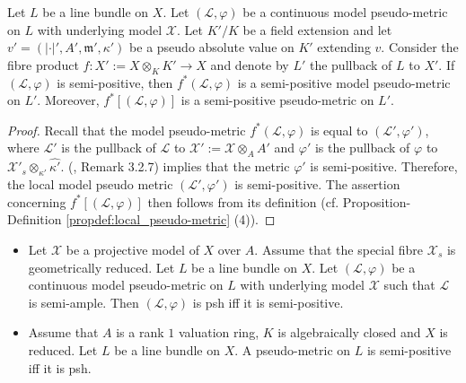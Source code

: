 \documentclass [11pt,reqno]{amsart}
\newcommand{\1}{\mathmybb{1}}
\def\cL{{\mathcal{L}}}
\def\cX{{\mathcal{X}}}
\def\m{\mathfrak m}
\begin{document}
\begin{proposition}
\label{prop:semi-positive_scalar_extension}
Let $L$ be a line bundle on $X$. Let $(\cL,\varphi)$ be a continuous model pseudo-metric on $L$ with underlying model $\cX$. Let $K'/K$ be a field extension and let $v'=(|\cdot|',A',\m',\kappa')$ be a pseudo absolute value on $K'$ extending $v$. Consider the fibre product $f : X':=X \otimes_{K} K' \to X$ and denote by $L'$ the pullback of $L$ to $X'$. If $(\cL,\varphi)$ is semi-positive, then $f^{\ast}(\cL,\varphi)$ is a semi-positive model pseudo-metric on $L'$. Moreover, $f^{\ast}[(\cL,\varphi)]$ is a semi-positive pseudo-metric on $L'$.
\end{proposition}

\begin{proof}
Recall that the model pseudo-metric $f^{\ast}(\cL,\varphi)$ is equal to $(\cL',\varphi')$, where $\cL'$ is the pullback of $\cL$ to $\cX':=\cX \otimes_{A} A'$ and $\varphi'$ is the pullback of $\varphi$ to $\cX'_{s} \otimes_{\kappa'} \widehat{\kappa'}$. (\cite{ChenMori21}, Remark 3.2.7) implies that the metric $\varphi'$ is semi-positive. Therefore, the local model pseudo metric $(\cL',\varphi')$ is semi-positive. The assertion concerning $f^{\ast}[(\cL,\varphi)]$ then follows from its definition (cf. Proposition-Definition \ref{propdef:local_pseudo-metric} (4)).
\end{proof}

\begin{proposition}
\label{prop:equivalence_psh_semi-positive}
\begin{itemize}
	\item[(1)] Let $\cX$ be a projective model of $X$ over $A$. Assume that the special fibre $\cX_{s}$ is geometrically reduced. Let $L$ be a line bundle on $X$. Let $(\cL,\varphi)$ be a continuous model pseudo-metric on $L$ with underlying model $\cX$ such that $\cL$ is semi-ample. Then $(\cL,\varphi)$ is psh iff it is semi-positive. 
	\item[(2)] Assume that $A$ is a rank $1$ valuation ring, $K$ is algebraically closed and $X$ is reduced. Let $L$ be a line bundle on $X$. A pseudo-metric on $L$ is semi-positive iff it is psh.
\end{itemize}
\end{proposition}
\end{document}
